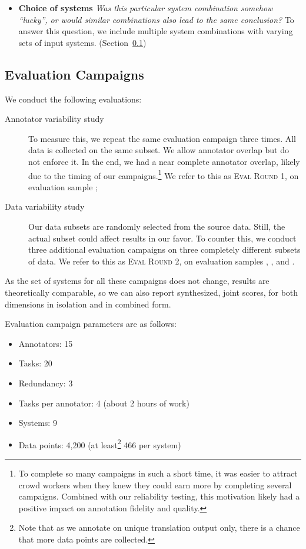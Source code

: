 \documentclass[a4paper]{article}
\begin{document}
\begin{CJK*}{UTF8}{gbsn}
\begin{itemize}
\item \textbf{Choice of systems} \emph{Was this particular system combination somehow ``lucky'', or would similar combinations also lead to the same conclusion?} To answer this question, we include multiple system combinations with varying sets of input systems. (Section~\ref{campaigns})
\end{itemize}

\subsection{Evaluation Campaigns}
\label{campaigns}

\bigskip\noindent We conduct the following evaluations:
\begin{description}


\item[Annotator variability study] To measure this, we repeat the same evaluation campaign three times. All data is collected on the same subset. We allow annotator overlap but do not enforce it. In the end, we had a near complete annotator overlap, likely due to the timing of our campaigns.\footnote{To complete so many campaigns in such a short time, it was easier to attract crowd workers when they knew they could earn more by completing several campaigns. Combined with our reliability testing, this motivation likely had a positive impact on annotation fidelity and quality.}  We refer to this as \textsc{Eval Round 1}, on evaluation sample \SubsetB;

\item[Data variability study] Our data subsets are randomly selected from the source data. Still, the actual subset could affect results in our favor. To counter this, we conduct three additional evaluation campaigns on three completely different subsets of data.  We refer to this as \textsc{Eval Round 2}, on evaluation samples \SubsetC,  \SubsetD, and  \SubsetE.
\end{description}

As the set of systems for all these campaigns does not change, results are theoretically comparable, so we can also report synthesized, joint scores, for both dimensions in isolation and in combined form.

\begin{samepage}
Evaluation campaign parameters are as follows:
\begin{itemize}[noitemsep]
\item Annotators: 15
\item Tasks: 20
\item Redundancy: 3
\item Tasks per annotator: 4 (about 2 hours of work)
\item Systems: 9
\item Data points: 4,200 (at least\footnote{Note that as we annotate on unique translation output only, there is a chance that more data points are collected.} 466 per system)
\end{itemize}
\end{samepage}


\end{CJK*}
\end{document}
